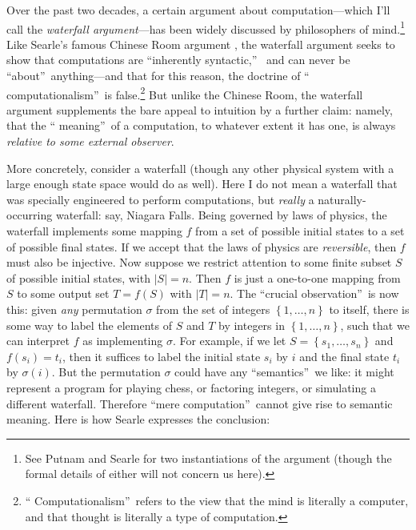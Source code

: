 \documentclass[12pt,onecolumn]{article}%
\begin{document}
Over the past two decades, a certain argument about computation---which I'll
call the \textit{waterfall argument}---has been widely discussed by
philosophers of mind.\footnote{See Putnam \cite[appendix]{putnam} and Searle
\cite{searle:redis} for two instantiations of the argument (though the formal
details of either will not concern us here).} Like Searle's famous Chinese
Room argument \cite{searle}, the waterfall argument seeks to show that
computations are \textquotedblleft inherently syntactic,\textquotedblright\ %
 and can never be \textquotedblleft about\textquotedblright\  anything---and
that for this reason, the doctrine of \textquotedblleft
computationalism\textquotedblright\  is false.\footnote{\textquotedblleft
Computationalism\textquotedblright\  refers to the view that the mind is
literally a computer, and that thought is literally a type of computation.}
 But unlike the Chinese Room, the waterfall argument supplements the bare
appeal to intuition by a further claim: namely, that the \textquotedblleft
meaning\textquotedblright\  of a computation, to whatever extent it has one, is
always \textit{relative to some external observer}.

More concretely, consider a waterfall (though any other physical system with a
large enough state space would do as well). Here I do not mean a waterfall
that was specially engineered to perform computations, but \textit{really} a
naturally-occurring waterfall: say, Niagara Falls. Being governed by laws of
physics, the waterfall implements some mapping $f$ from a set of possible
initial states to a set of possible final states. If we accept that the laws
of physics are \textit{reversible}, then $f$ must also be injective. Now
suppose we restrict attention to some finite subset $S$ of possible initial
states, with $\left\vert S\right\vert =n$. Then $f$ is just a one-to-one
mapping from $S$ to some output set $T=f\left(  S\right)  $ with $\left\vert
T\right\vert =n$. The \textquotedblleft crucial
observation\textquotedblright\  is now this: given \textit{any} permutation
$\sigma$ from the set of integers $\left\{  1,\ldots,n\right\}  $ to itself,
there is some way to label the elements of $S$ and $T$ by integers in
$\left\{  1,\ldots,n\right\}  $, such that we can interpret $f$ as
implementing $\sigma$. For example, if we let $S=\left\{  s_{1}%
,\ldots,s_{n}\right\}  $ and $f\left(  s_{i}\right)  =t_{i}$, then it
suffices to label the initial state $s_{i}$ by $i$ and the final state
$t_{i}$ by $\sigma\left(  i\right)  $. But the permutation $\sigma$ could
have any \textquotedblleft semantics\textquotedblright\  we like: it might
represent a program for playing chess, or factoring integers, or simulating a
different waterfall. Therefore \textquotedblleft mere
computation\textquotedblright\  cannot give rise to semantic meaning. Here is
how Searle \cite[p. 57]{searle:redis} expresses the conclusion:
\end{document}
